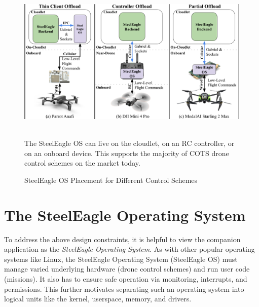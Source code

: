 \begin{figure}
    \centering
    \includegraphics[width=1.0\linewidth]{chapter7/FIGS/hardware-agnostic.png}
    \begin{captext}
    \\[0.2cm] \small The SteelEagle OS can live on the cloudlet, on an RC controller, or on an onboard device. This supports the majority of COTS drone control schemes on the market today.
    \end{captext}
    \caption{SteelEagle OS Placement for Different Control Schemes}
    \label{fig:hardware-agnosticism}
\end{figure}

\section{The SteelEagle Operating System}
\label{sec:companion-operating-system}
To address the above design constraints, it is helpful to view the companion application as the \textit{SteelEagle Operating System}. As with other popular operating systems like Linux, the SteelEagle Operating System (SteelEagle OS) must manage varied underlying hardware (drone control schemes) and run user code (missions). It also has to ensure safe operation via monitoring, interrupts, and permissions. This further motivates separating such an operating system into logical units like the kernel, userspace, memory, and drivers.


